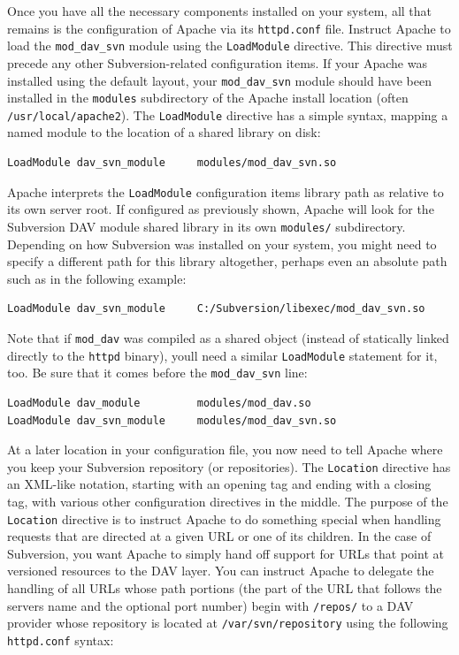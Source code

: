 Once you have all the necessary components installed on your system, all
that remains is the configuration of Apache via its \texttt{httpd.conf}
file. Instruct Apache to load the \texttt{mod\_dav\_svn} module using
the \texttt{LoadModule} directive. This directive must precede any other
Subversion-related configuration items. If your Apache was installed
using the default layout, your \texttt{mod\_dav\_svn} module should have
been installed in the \texttt{modules} subdirectory of the Apache
install location (often \texttt{/usr/local/apache2}). The
\texttt{LoadModule} directive has a simple syntax, mapping a named
module to the location of a shared library on disk:

\begin{verbatim}
LoadModule dav_svn_module     modules/mod_dav_svn.so
\end{verbatim}

Apache interprets the \texttt{LoadModule} configuration
item\textquotesingle s library path as relative to its own server root.
If configured as previously shown, Apache will look for the Subversion
DAV module shared library in its own \texttt{modules/} subdirectory.
Depending on how Subversion was installed on your system, you might need
to specify a different path for this library altogether, perhaps even an
absolute path such as in the following example:

\begin{verbatim}
LoadModule dav_svn_module     C:/Subversion/libexec/mod_dav_svn.so
\end{verbatim}

Note that if \texttt{mod\_dav} was compiled as a shared object (instead
of statically linked directly to the \texttt{httpd} binary),
you\textquotesingle ll need a similar \texttt{LoadModule} statement for
it, too. Be sure that it comes before the \texttt{mod\_dav\_svn} line:

\begin{verbatim}
LoadModule dav_module         modules/mod_dav.so
LoadModule dav_svn_module     modules/mod_dav_svn.so
\end{verbatim}

At a later location in your configuration file, you now need to tell
Apache where you keep your Subversion repository (or repositories). The
\texttt{Location} directive has an XML-like notation, starting with an
opening tag and ending with a closing tag, with various other
configuration directives in the middle. The purpose of the
\texttt{Location} directive is to instruct Apache to do something
special when handling requests that are directed at a given URL or one
of its children. In the case of Subversion, you want Apache to simply
hand off support for URLs that point at versioned resources to the DAV
layer. You can instruct Apache to delegate the handling of all URLs
whose path portions (the part of the URL that follows the
server\textquotesingle s name and the optional port number) begin with
\texttt{/repos/} to a DAV provider whose repository is located at
\texttt{/var/svn/repository} using the following \texttt{httpd.conf}
syntax:


